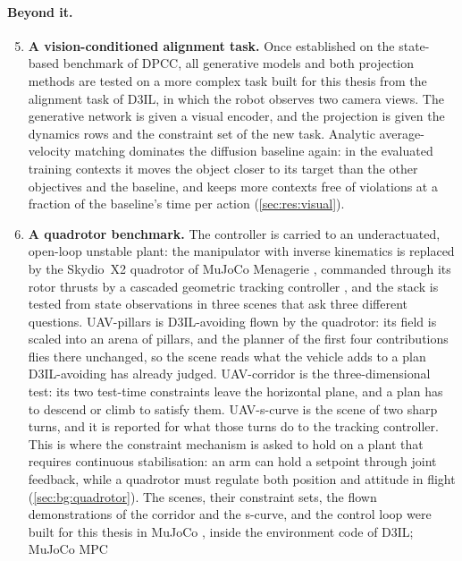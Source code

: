 \paragraph{Beyond it.}
\begin{enumerate}
  \setcounter{enumi}{4}
  \item \textbf{A vision-conditioned alignment task.} Once established on the state-based benchmark
    of \ac{DPCC}, all generative models and both projection methods are tested on a more complex
    task built for this thesis from the alignment task of D3IL, in which the robot observes two camera
    views. The generative network is given a visual encoder, and the projection is given the dynamics
    rows and the constraint set of the new task.
    Analytic average-velocity matching dominates the diffusion baseline again: in the evaluated
    training contexts it moves the object closer to its target than the other objectives and the
    baseline, and keeps more contexts free of violations at a fraction of the baseline's time per
    action (\autoref{sec:res:visual}).
  \item \textbf{A quadrotor benchmark.} The controller is carried to an underactuated, open-loop
    unstable plant: the manipulator with inverse kinematics is replaced by the Skydio~X2 quadrotor of
    MuJoCo Menagerie \parencite{zakka2022menagerie}, commanded through its rotor thrusts by a cascaded
    geometric tracking controller \parencite{lee2010geometric}, and the stack is tested from state
    observations in three scenes that ask three different questions. UAV-pillars is
    D3IL-avoiding flown by the quadrotor: its field is scaled into an arena of pillars, and
    the planner of the first four contributions flies there unchanged, so the scene reads what the
    vehicle adds to a plan D3IL-avoiding has already judged. UAV-corridor is the three-dimensional test:
    its two test-time constraints leave the horizontal plane, and a plan has to descend or climb to
    satisfy them. UAV-s-curve is the scene of two sharp turns, and it is reported for what those turns
    do to the tracking controller. This is where the constraint mechanism is asked to hold on a plant
    that requires continuous stabilisation: an arm can hold a setpoint through joint feedback, while
    a quadrotor must regulate both position and attitude in flight
    (\autoref{sec:bg:quadrotor}). The scenes, their constraint sets, the flown demonstrations of the
    corridor and the s-curve, and the control loop were built for this thesis in MuJoCo
    \parencite{todorov2012mujoco}, inside the environment code of D3IL; MuJoCo MPC

\end{enumerate}
